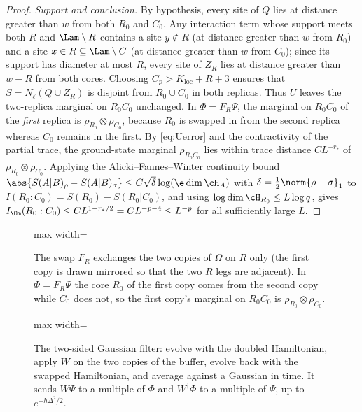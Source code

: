 \begin{proof}
\emph{Support and conclusion.} By hypothesis, every site of $Q$ lies at distance greater than $w$ from
both $R_0$ and $C_0$. Any interaction term whose support meets both $R$ and $\Lam\setminus R$
contains a site $y\notin R$ (at distance greater than $w$ from $R_0$) and a site
$x\in R\subseteq\Lam\setminus C$ (at distance greater than $w$ from $C_0$); since its support
has diameter at most $R$, every site of $Z_R$ lies at distance greater than $w-R$ from
both cores. Choosing $C_p>K_{\mathrm{loc}}+R+3$ ensures that $S=N_\ell(Q\cup Z_R)$ is
disjoint from $R_0\cup C_0$ in both replicas. Thus $U$ leaves the
two-replica marginal on $R_0C_0$ unchanged. In $\Phi=F_R\Psi$, the marginal on
$R_0C_0$ of the \emph{first} replica is $\rho_{R_0}\otimes\rho_{C_0}$,
because $R_0$ is swapped in from the second replica whereas $C_0$ remains in the first. By
\eqref{eq:Uerror} and the contractivity of the partial trace, the ground-state
marginal $\rho_{R_0C_0}$ lies within trace distance $CL^{-r_*}$ of
$\rho_{R_0}\otimes\rho_{C_0}$. Applying the Alicki--Fannes--Winter continuity bound
$\abs{S(A|B)_\rho-S(A|B)_\sigma}\le C\sqrt\delta\log(\e\dim\cH_A)$ with
$\delta=\frac12\norm{\rho-\sigma}_1$ \cite{Winter2016} to
$I(R_0:C_0)=S(R_0)-S(R_0|C_0)$, and using $\log\dim\cH_{R_0}\le L\log q$, gives
$I_\Om(R_0:C_0)\le CL^{1-r_*/2}=CL^{-p-4}\le L^{-p}$ for all sufficiently large $L$.
\end{proof}

\begin{figure}[t]
\centering
\begin{adjustbox}{max width=\linewidth}

\end{adjustbox}
\caption{The swap $F_R$ exchanges the two copies of $\Omega$ on $R$ only (the first copy is drawn mirrored so that the two $R$ legs are adjacent). In $\Phi=F_R\Psi$ the core $R_0$ of the first copy comes from the second copy while $C_0$ does not, so the first copy's marginal on $R_0C_0$ is $\rho_{R_0}\otimes\rho_{C_0}$.}\label{fig:replica-swap}
\end{figure}

\begin{figure}[t]
\centering
\begin{adjustbox}{max width=\linewidth}

\end{adjustbox}
\caption{The two-sided Gaussian filter: evolve with the doubled Hamiltonian, apply $W$ on the two copies of the buffer, evolve back with the swapped Hamiltonian, and average against a Gaussian in time. It sends $W\Psi$ to a multiple of $\Phi$ and $W^\dagger\Phi$ to a multiple of $\Psi$, up to $e^{-h\Delta^2/2}$.}\label{fig:qc-gaussian-filter}
\end{figure}

